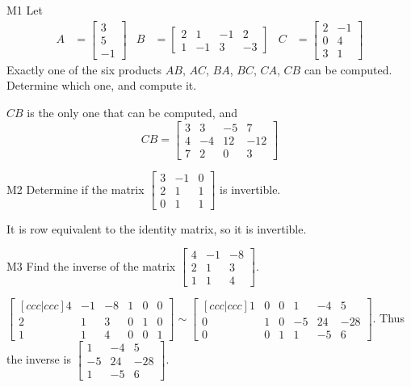 \documentclass{sbgLAsemi}
\begin{document}
\begin{problem}{M1}
Let 
\begin{align*}
A &= \begin{bmatrix} 3 \\ 5 \\ -1  \end{bmatrix} & B&=\begin{bmatrix}  2 & 1 & -1 & 2 \\ 1 & -1 & 3 & -3  \end{bmatrix} & C &= \begin{bmatrix} 2 & -1 \\ 0 & 4 \\ 3 & 1 \end{bmatrix} \end{align*}
Exactly one of the six products $AB$, $AC$, $BA$, $BC$, $CA$, $CB$ can be computed.  Determine which one, and compute it.
\end{problem}
\begin{solution}
$CB$ is the only one that can be computed, and
$$CB=\begin{bmatrix} 3 & 3 & -5 & 7 \\ 4 & -4 & 12 & -12 \\ 7 & 2 & 0 & 3 \end{bmatrix}$$
\end{solution}
\begin{problem}{M2}
Determine if the matrix $\begin{bmatrix} 3 & -1 & 0  \\ 2 & 1 & 1  \\ 0 & 1 & 1   \end{bmatrix}$ is invertible.
\end{problem}
\begin{solution}
It is row equivalent to the identity matrix, so it is invertible.
\end{solution}


\begin{problem}{M3}
  Find the inverse of the matrix
  \(\begin{bmatrix}
    4 & -1 & -8  \\
    2 & 1 & 3  \\
    1 & 1 & 4
  \end{bmatrix}\).
\end{problem}
\begin{solution}
\(\begin{bmatrix}[ccc|ccc]
  4 & -1 & -8 & 1 & 0 & 0  \\
  2 & 1 & 3   & 0 & 1 & 0 \\
  1 & 1 & 4   & 0 & 0 & 1
\end{bmatrix}\sim\begin{bmatrix}[ccc|ccc]
  1 & 0 & 0 & 1 & -4 & 5 \\
  0 & 1 & 0 & -5 & 24 & -28 \\
  0 & 0 & 1 & 1 & -5 & 6
\end{bmatrix}\). Thus the inverse is
\(\begin{bmatrix}
  1 & -4 & 5  \\
  -5 & 24 & -28  \\
  1 & -5 & 6
\end{bmatrix}\).
\end{solution}
\end{document}
